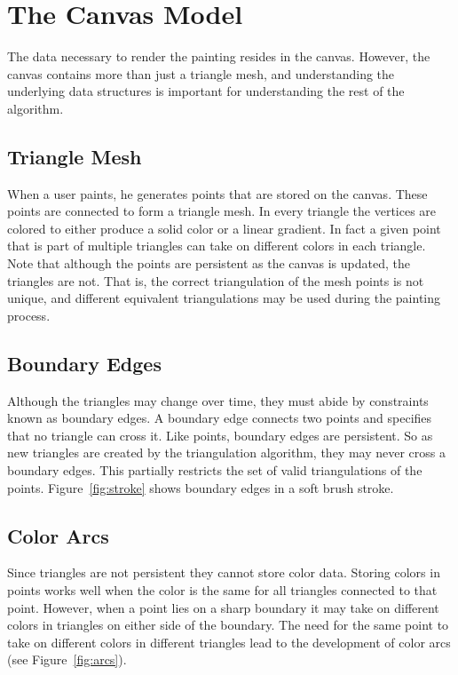 \documentclass[review]{acmsiggraph}
\begin{document}
\section{The Canvas Model}
The data necessary to render the painting resides in the canvas. However, the canvas contains more than just
a triangle mesh, and understanding the underlying data structures is important for 
understanding the rest of the algorithm.

\subsection{Triangle Mesh}
When a user paints, he generates points that are stored on the canvas. These points are
connected to form a triangle mesh. In every triangle the vertices are colored to either
produce a solid color or a linear gradient. In fact a given point that is part of
multiple triangles can take on different colors in each triangle. Note that although
the points are persistent as the canvas is updated, the triangles are not.  That is, the correct triangulation of the mesh points is not unique, and different equivalent triangulations may be used during the painting process.

\subsection{Boundary Edges}
Although the triangles may change over time, they must abide by constraints known as
boundary edges. A boundary edge connects two points and specifies that no triangle
can cross it. Like points, boundary edges are persistent. So as new triangles are created by the triangulation algorithm, they
may never cross a boundary edges.  This partially restricts the set of valid triangulations of the points.  Figure~\ref{fig:stroke} shows boundary edges in a soft brush stroke.


\subsection{Color Arcs}
Since triangles are not persistent they cannot store color data.
Storing colors in points works well when the color is the same for all triangles connected
to that point. However, when a point lies on a sharp boundary it may take on different colors in
triangles on either side of the boundary. The need for the same point to take on different
colors in different triangles lead to the development of color arcs (see Figure~\ref{fig:arcs}).
\end{document}
